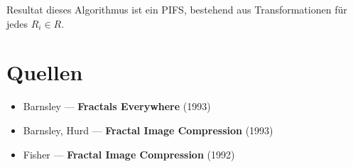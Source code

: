 \documentclass[afourpaper]{tufte-handout}
\begin{document}
Resultat dieses Algorithmus ist ein PIFS, bestehend aus Transformationen für jedes \( R_i \in R \).


\section{Quellen}

\begin{itemize}
  \item Barnsley --- \textbf{Fractals Everywhere} (1993)
  \item Barnsley, Hurd --- \textbf{Fractal Image Compression} (1993)
  \item Fisher --- \textbf{Fractal Image Compression} (1992)
\end{itemize}
\end{document}
